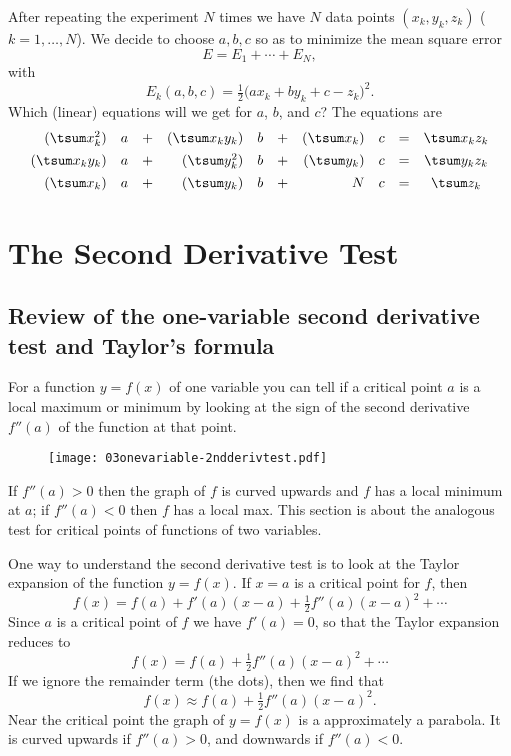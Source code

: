 \begin{multicols}{2}
After repeating the experiment $N$ times we have $N$ data points
$(x_k, y_k, z_k)$ ($k=1, \ldots, N$).  We decide to choose $a,b,c$ so
as to minimize the mean square error
\[
E=E_1+\cdots+E_N,
\]
with
\[
E_k(a, b, c) = \tfrac 12 \bigl(ax_k+by_k+c- z_k\bigr)^2.
\]
Which (linear) equations will we get for $a$, $b$, and $c$?
\answer The equations are 
\[
\begin{array}{rlcrlcrlrcl}
    (\tsum x_k^2)&a &+&(\tsum x_ky_k)&b &+& (\tsum x_k)&c 
    &=& \tsum x_kz_k\\[1ex]
    (\tsum x_ky_k)&a &+&(\tsum y_k^2)&b &+& (\tsum y_k)&c 
    &=& \tsum y_kz_k\\[1ex]
    (\tsum x_k)&a &+&(\tsum y_k)&b &+& N&c &=& \tsum z_k
\end{array}
\]
\endanswer
\noproblemfont
\end{multicols}

\section{The Second Derivative Test}    
\label{sec:second-deriv-test}

\subsection{Review of the one-variable second derivative test and Taylor's formula}
For a function $y=f(x)$ of one variable you can tell if a critical
point $a$ is a local maximum or minimum by looking at the sign of the
second derivative $f''(a)$ of the function at that point.  

\begin{figure}[ht]\centering
  \texttt{[image: 03onevariable-2ndderivtest.pdf]}
\end{figure}
If $f''(a)>0$ then the graph of $f$ is curved upwards and $f$ has a local
minimum at $a$; if $f''(a)<0$ then $f$ has a local max.  This section
is about the analogous test for critical points of functions of two
variables.  

One way to understand the second derivative test is to look at the
Taylor expansion of the function $y=f(x)$.  If $x=a$ is a critical
point for $f$, then
\[
f(x) = f(a) + f'(a)(x-a) + \tfrac 12 f''(a)(x-a)^2
+\cdots
\]
Since $a$ is a critical point of $f$ we have $f'(a)=0$, so that the
Taylor expansion reduces to
\begin{equation}\label{eq:one-variable-expansion-at-cpt}
  f(x) = f(a) + \tfrac 12 f''(a)(x-a)^2 +\cdots
\end{equation}
If we ignore the remainder term (the dots), then we find that
\[
f(x) \approx f(a) + \tfrac 12 f''(a)(x-a)^2.
\]
Near the critical point the graph of $y=f(x)$ is a approximately a
parabola. It is curved upwards if $f''(a)>0$, and downwards if
$f''(a)<0$.

